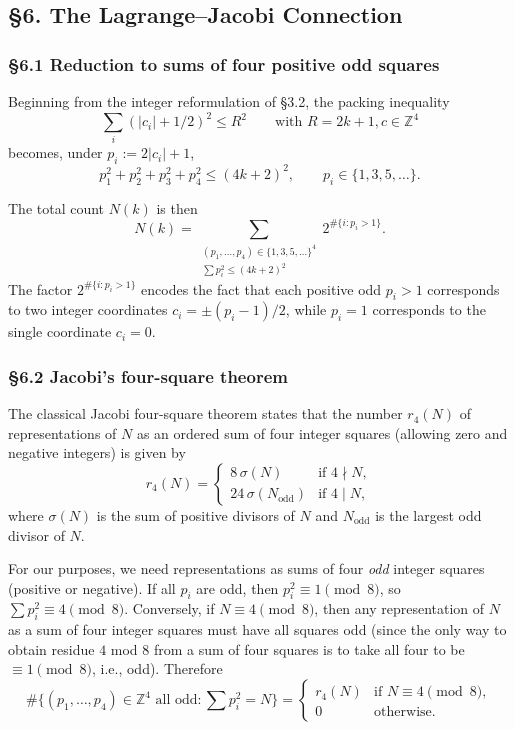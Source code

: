 \documentclass[a4paper,11pt]{article}
\theoremstyle{definition}
\begin{document}
\subsection{§6. The Lagrange--Jacobi
Connection}\label{the-lagrangejacobi-connection}

\subsubsection{§6.1 Reduction to sums of four positive odd
squares}\label{reduction-to-sums-of-four-positive-odd-squares}

Beginning from the integer reformulation of §3.2, the packing inequality
\[\sum_i (|c_i| + 1/2)^2 \le R^2 \qquad \text{with } R = 2k+1, c \in \mathbb{Z}^4\]
becomes, under \(p_i := 2|c_i| + 1\),
\[p_1^2 + p_2^2 + p_3^2 + p_4^2 \le (4k+2)^2, \qquad p_i \in \{1, 3, 5, \ldots\}.\]

The total count \(N(k)\) is then
\[N(k) = \sum_{\substack{(p_1, \ldots, p_4) \in \{1,3,5,\ldots\}^4 \\ \sum p_i^2 \le (4k+2)^2}} 2^{\#\{i : p_i > 1\}}.\]
The factor \(2^{\#\{i : p_i > 1\}}\) encodes the fact that each positive
odd \(p_i > 1\) corresponds to two integer coordinates
\(c_i = \pm (p_i-1)/2\), while \(p_i = 1\) corresponds to the single
coordinate \(c_i = 0\).

\subsubsection{§6.2 Jacobi's four-square
theorem}\label{jacobis-four-square-theorem}

The classical Jacobi four-square theorem states that the number
\(r_4(N)\) of representations of \(N\) as an ordered sum of four integer
squares (allowing zero and negative integers) is given by
\[r_4(N) = \begin{cases} 8\,\sigma(N) & \text{if } 4 \nmid N, \\ 24\,\sigma(N_{\mathrm{odd}}) & \text{if } 4 \mid N, \end{cases}\]
where \(\sigma(N)\) is the sum of positive divisors of \(N\) and
\(N_{\mathrm{odd}}\) is the largest odd divisor of \(N\).

For our purposes, we need representations as sums of four \emph{odd}
integer squares (positive or negative). If all \(p_i\) are odd, then
\(p_i^2 \equiv 1 \pmod 8\), so \(\sum p_i^2 \equiv 4 \pmod 8\).
Conversely, if \(N \equiv 4 \pmod 8\), then any representation of \(N\)
as a sum of four integer squares must have all squares odd (since the
only way to obtain residue \(4\) mod \(8\) from a sum of four squares is
to take all four to be \(\equiv 1 \pmod 8\), i.e., odd). Therefore
\[\#\{(p_1, \ldots, p_4) \in \mathbb{Z}^4 \text{ all odd}: \sum p_i^2 = N\} = \begin{cases} r_4(N) & \text{if } N \equiv 4 \pmod 8, \\ 0 & \text{otherwise.} \end{cases}\]
\end{document}
